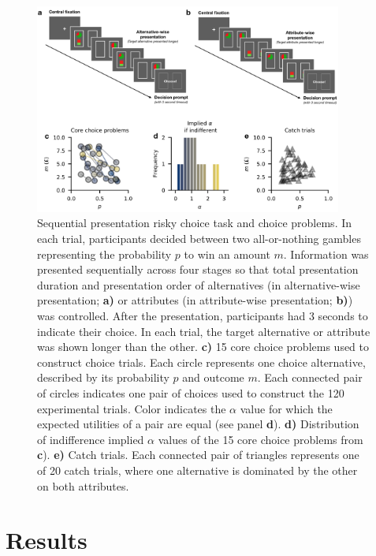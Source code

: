 \documentclass[11pt, a4paper, twocolumn, abstract]{scrartcl}
\begin{document}
\begin{figure}[t!]
    \centering
    \includegraphics[width=0.9\textwidth]{figures/task_and_stimuli.png}
    \caption{Sequential presentation risky choice task and choice problems. In each trial, participants decided between two all-or-nothing gambles representing the probability $p$ to win an amount $m$. Information was presented sequentially across four stages so that total presentation duration and presentation order of alternatives (in alternative-wise presentation; \textbf{a)} or attributes (in attribute-wise presentation; \textbf{b)}) was controlled. After the presentation, participants had 3 seconds to indicate their choice. In each trial, the target alternative or attribute was shown longer than the other. \textbf{c)} 15 core choice problems used to construct choice trials. Each circle represents one choice alternative, described by its probability $p$ and outcome $m$. Each connected pair of circles indicates one pair of choices used to construct the 120 experimental trials. Color indicates the $\alpha$ value for which the expected utilities of a pair are equal (see panel \textbf{d}). \textbf{d)} Distribution of indifference implied $\alpha$ values of the 15 core choice problems from \textbf{c}). \textbf{e)} Catch trials. Each connected pair of triangles represents one of 20 catch trials, where one alternative is dominated by the other on both attributes.}
    \label{fig:taskstimuli}
\end{figure}

\section*{Results}
\end{document}
